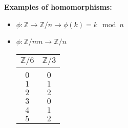 \documentclass[12pt]{report}
\newcommand{\Z}{\mathbb{Z}}
\begin{document}
\textbf{Examples of homomorphisms:}
\begin{itemize}
    \item $\phi: \Z \to \Z/n \longrightarrow \phi(k) = k\mod n$ 
    \item $\phi: \Z/mn \to \Z/n$ 
    \begin{center}
        \begin{tabular*}{2in}{|c|c|}
            $\Z/6$ & $\Z/3$\\
            \hline\\
            $0$ & $0$\\
            $1$ & $1$\\
            $2$ & $2$\\
            $3$ & $0$\\
            $4$ & $1$\\
            $5$ & $2$
        \end{tabular*}
    \end{center}
\end{itemize}
\end{document}
